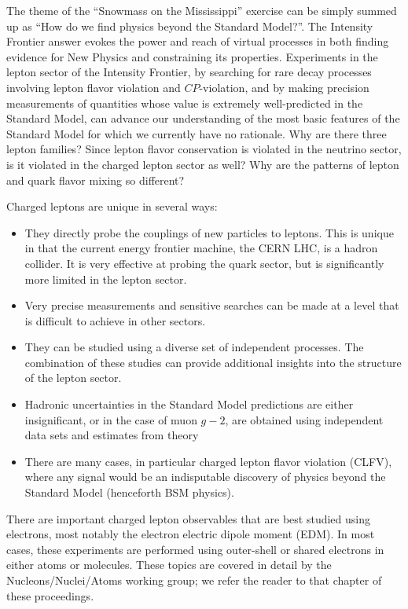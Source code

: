 The theme of the ``Snowmass on the Mississippi'' exercise can be simply summed up as ``How do we find physics beyond the Standard Model?''. The Intensity Frontier answer evokes the power and reach of virtual processes in both finding evidence for New Physics and constraining its properties. Experiments in the lepton sector of the Intensity Frontier, by searching for rare decay processes involving lepton flavor violation and $C\!P$-violation, and by making precision measurements of quantities whose value is extremely well-predicted in the Standard Model, can advance our understanding of the most basic features of the Standard Model for which we currently have no rationale. Why are there three lepton families? Since lepton flavor conservation is violated in the neutrino sector, is it violated in the charged lepton sector as well? Why are the patterns of lepton and quark flavor mixing so different?

 Charged leptons are unique in several ways:
\begin{itemize}
\item
They directly probe the couplings of new particles to leptons.  This is unique in that the current energy frontier machine, the 
CERN LHC, is a hadron
collider. It is very effective at probing the quark sector, but
is significantly more limited in the lepton sector.
\item
Very
precise measurements  and sensitive searches can be made at a level that is difficult to achieve in
other sectors.
\item
They can be studied using a diverse set of independent
processes. The combination of these studies can provide additional
insights into the structure of the lepton sector.
\item
Hadronic uncertainties in the Standard Model predictions are either insignificant, or in the case of muon $g-2$, are obtained using independent data sets and estimates from theory
\item
There are  many cases, in particular charged lepton flavor violation (CLFV), where any signal would be an indisputable discovery of physics beyond the Standard Model (henceforth BSM physics).
\end{itemize}

There are important charged lepton observables that are best studied using electrons, most notably the electron electric dipole moment (EDM).  In most cases, these experiments are performed using outer-shell or shared electrons in either atoms or molecules.  These topics are covered in detail by the Nucleons/Nuclei/Atoms working group; we refer the reader to that chapter of these proceedings.

